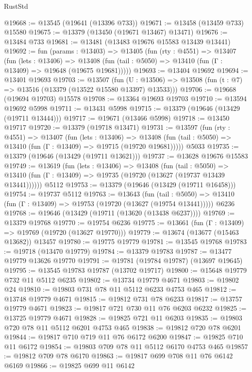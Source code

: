 \begin{lexlean}{RustStd}
\begin{coremodule}
@19668 := @13545 (@19641 (@13396 @733))
@19671 := @13458 (@13459 @733) @15580
@19675 := @13379 (@13450 (@19671 @13467) @13471)
@19676 := @13484 @733
@19681 := @13481 (@13483 @19676 @15583 @13439 @13441)
@19692 := fun (params : @13403) =>
  @13405
    (fun (rty : @4551) =>
    @13407
      (fun (lets : @13406) =>
      @13408 (fun (tail : @5050) => @13410 (fun (Γ : @13409) => @19648 (@19675 @19681)))))
@19693 := @13404 @19692
@19694 := @13401 @19693
@19703 := @13507
    (fun (U : @13506) => @13508 (fun (t : @7) => @13516 (@13379 (@13522 @15580 @13397) @13533)))
@19706 := @19668 (@19694 @19703) @15578
@19708 := @13364 @19693 @19703
@19710 := @13594 @19692 @5998
@19711 := @13431 @5998
@19715 := @13379 (@19646 (@13429 (@19711 @13444)))
@19717 := @19671 (@13466 @5998)
@19718 := @13450 @19717
@19720 := @13379 (@19718 @13471)
@19731 := @13597
    (fun (rty : @4551) =>
    @13407
      (fun (lets : @13406) =>
      @13408 (fun (tail : @5050) => @13410 (fun (Γ : @13409) => @19715 (@19720 @19681)))))
    @5033
@19735 := @13379 (@19646 (@13429 (@19711 @13621)))
@19737 := @13628 @19676 @15583
@19749 := @13619
    (fun (lets : @13406) =>
    @13408
      (fun (tail : @5050) =>
      @13410 (fun (Γ : @13409) => @19735 (@19720 (@13627 (@19737 @13439 @13441))))))
    @5112
@19753 := @13379 (@19646 (@13429 (@19711 @16458)))
@19754 := @19737 @5112
@19763 := @13643
    (fun (tail : @5050) => @13410 (fun (Γ : @13409) => @19753 (@19720 (@13627 (@19754 @13441)))))
    @6236
@19768 := @19646 (@13429 (@19711 (@13620 (@13438 @6237))))
@19769 := @13379 @19768
@19770 := @19754 @6236
@19775 := @13661 (fun (Γ : @13409) => @19769 (@19720 (@13627 @19770)))
@19779 := @13674 (@13677 (@15463 @13682)) @13457
@19780 := @19775 @19779
@19781 := @13545 @19768
@19783 := @19718 (@13470 @19779)
@19784 := @13379 @19783
@19787 := @13477 @19779 @13626 @19770
@19791 := @19781 (@19784 @19787) (@13697 @19645)
@19795 := @13545 @19783 @19787 (@13702 @19717)
@19800 := @15648 @19779 @732 @11 @5112 @6235
@19802 := @13734 @19779 @4671
@19803 := @19802 @24
@19810 := @19803 @731 @78 @11 @5112 @6233 @4753 @465
@19812 := @13748 @19779 @4671
@19815 := @19812 @731 @78 @6233
@19817 := @13757 @19779 @4671
@19823 := @19817 @721 @730 @11 @76 @6203 @6232
@19825 := @13725 @19779 @4671
@19828 := @19825 @721 @11 @6203
@19835 := @19803 @720 @78 @11 @5112 @6201 @4753 @465
@19838 := @19812 @720 @78 @6201
@19844 := @19817 @710 @719 @11 @76 @6172 @6200
@19847 := @19825 @710 @11 @6172
@19854 := @19803 @709 @78 @11 @5112 @6170 @4753 @465
@19857 := @19812 @709 @78 @6170
@19863 := @19817 @699 @708 @11 @76 @6142 @6169
@19866 := @19825 @699 @11 @6142

\end{coremodule}
\end{lexlean}

